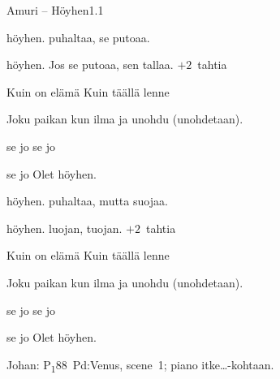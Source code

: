 \documentclass[12pt,a4paper]{article}
\begin{document}
\thispagestyle{empty}
\begin{mysong}{Amuri – Höyhen}{1.1}


\begin{SBVerse}
   höyhen.  puhaltaa,  se putoaa.

   höyhen. Jos se  putoaa,  sen
  tallaa. {\SBLyricNoteFont $+2$~tahtia}
\end{SBVerse}

\begin{SBChorus}
  Kuin  on elämä  Kuin  täällä
  lenne

  Joku  paikan  kun ilma  ja
  unohdu (unohdetaan).

     se jo 
     se jo 

     se jo  Olet
  höyhen.
\end{SBChorus}


\begin{SBVerse}
   höyhen.  puhaltaa, mutta 
  suojaa.

   höyhen.  luojan,  tuojan.
  {\SBLyricNoteFont $+2$~tahtia}
\end{SBVerse}

\begin{SBChorus}
  Kuin  on elämä  Kuin  täällä
  lenne

  Joku  paikan  kun ilma  ja
  unohdu (unohdetaan).

     se jo 
     se jo 

     se jo  Olet
  höyhen.
\end{SBChorus}


{\SBLyricNoteFont Johan: P\textsubscript{1}88~Pd:Venus, scene~1; piano
itke\ldots-kohtaan.}

\end{mysong}
\end{document}
